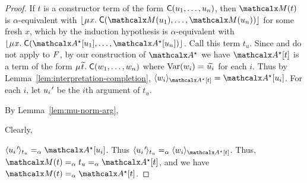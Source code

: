 \begin{proof}
If $t$ is a constructor term of the form $\textsf{C}( u_1, \ldots, u_n )$,
then $\M( t )$ is $\alpha$-equivalent with $\nf{\MU x.\; \const{C}( \M( u_1 ), \ldots, \M( u_n ) ) }$ for some fresh $x$,
which by the induction hypothesis is $\alpha$-equivalent with $\nf{\MU x.\; \const{C}( \ValC \ec{ u_1 }, \ldots, \ValC \ec{ u_n } )}$.
Call this term $t_u$.
Since  and  do not apply to $F$,
by our construction of $\ValC$ we have $\ValC \ec{t}$ is a term
of the form $\MU {\Varec{t}}.\; \const{C}( w_1, \ldots, w_n )$
where
$\muvar(w_i) = {\Varec{u_i}}$ for each $i$.  Thus by Lemma~\ref{lem:interpretation-completion},
$\interp{\ValC \ec{t}}{w_i} = \ValC \ec{u_i}$.
For each $i$, let $u_\iPrime$ be the $i$\vvthinspace th argument of $t_u$.
\begin{rep}By Lemma~\ref{lem:mu-norm-arg},\end{rep}%
\begin{conf}Clearly,\end{conf} %
$\interp{t_u}{u_\iPrime} \vsim \ValC \ec{u_i}$.
Thus $\interp{t_u}{u_\iPrime} \vsim \interp{\ValC \ec{t}}{ w_i }$. %
Thus, $\M( t ) \vsim t_u \vsim \ValC \ec{t}$, and
we have $\M( t ) \vsim \ValC \ec{t}$.


\end{proof}
